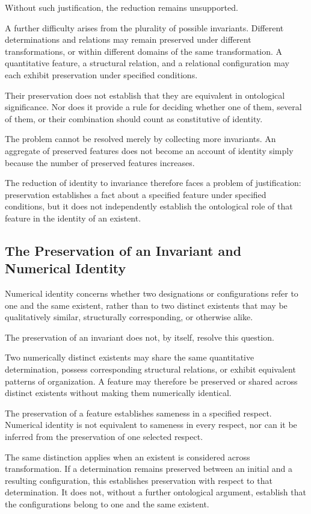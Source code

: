 Without such justification, the reduction remains
unsupported.

A further difficulty arises from the plurality
of possible invariants. Different determinations
and relations may remain preserved under different
transformations, or within different domains of
the same transformation. A quantitative feature,
a structural relation, and a relational configuration
may each exhibit preservation under specified
conditions.

Their preservation does not establish that they
are equivalent in ontological significance. Nor
does it provide a rule for deciding whether one
of them, several of them, or their combination
should count as constitutive of identity.

The problem cannot be resolved merely by collecting
more invariants. An aggregate of preserved features
does not become an account of identity simply
because the number of preserved features increases.

The reduction of identity to invariance therefore
faces a problem of justification: preservation
establishes a fact about a specified feature under
specified conditions, but it does not independently
establish the ontological role of that feature
in the identity of an existent.

\subsection{The Preservation of an Invariant and Numerical Identity}

Numerical identity concerns whether two designations
or configurations refer to one and the same existent,
rather than to two distinct existents that may be
qualitatively similar, structurally corresponding,
or otherwise alike.

The preservation of an invariant does not, by itself,
resolve this question.

Two numerically distinct existents may share the
same quantitative determination, possess corresponding
structural relations, or exhibit equivalent patterns
of organization. A feature may therefore be preserved
or shared across distinct existents without making
them numerically identical.

The preservation of a feature establishes sameness
in a specified respect. Numerical identity is not
equivalent to sameness in every respect, nor can
it be inferred from the preservation of one selected
respect.

The same distinction applies when an existent is
considered across transformation. If a determination
remains preserved between an initial and a resulting
configuration, this establishes preservation with
respect to that determination. It does not, without
a further ontological argument, establish that
the configurations belong to one and the same
existent.

